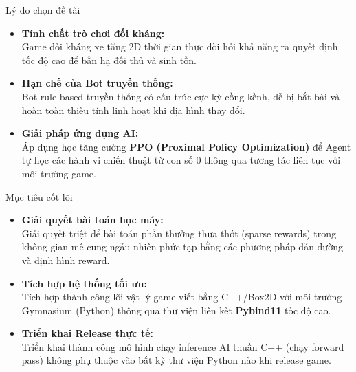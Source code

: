 \documentclass[aspectratio=169]{beamer}
\begin{document}
\begin{frame}{Lý do chọn đề tài}
  \begin{itemize}
    \item \textbf{\color{hustred}Tính chất trò chơi đối kháng:} \\
      Game đối kháng xe tăng 2D thời gian thực đòi hỏi khả năng ra quyết định tốc độ cao để bắn hạ đối thủ và sinh tồn.
    \vspace{0.8em}
    \item \textbf{\color{hustred}Hạn chế của Bot truyền thống:} \\
      Bot rule-based truyền thống có cấu trúc cực kỳ cồng kềnh, dễ bị bắt bài và hoàn toàn thiếu tính linh hoạt khi địa hình thay đổi.
    \vspace{0.8em}
    \item \textbf{\color{hustgreen}Giải pháp ứng dụng AI:} \\
      Áp dụng học tăng cường \textbf{PPO (Proximal Policy Optimization)} để Agent tự học các hành vi chiến thuật từ con số 0 thông qua tương tác liên tục với môi trường game.
  \end{itemize}
\end{frame}

\begin{frame}{Mục tiêu cốt lõi}
  \begin{itemize}
    \item \textbf{\color{hustred}Giải quyết bài toán học máy:} \\
      Giải quyết triệt để bài toán phần thưởng thưa thớt (sparse rewards) trong không gian mê cung ngẫu nhiên phức tạp bằng các phương pháp dẫn đường và định hình reward.
    \vspace{0.8em}
    \item \textbf{\color{hustred}Tích hợp hệ thống tối ưu:} \\
      Tích hợp thành công lõi vật lý game viết bằng C++/Box2D với môi trường Gymnasium (Python) thông qua thư viện liên kết \textbf{Pybind11} tốc độ cao.
    \vspace{0.8em}
    \item \textbf{\color{hustgreen}Triển khai Release thực tế:} \\
      Triển khai thành công mô hình chạy inference AI thuần C++ (chạy forward pass) không phụ thuộc vào bất kỳ thư viện Python nào khi release game.
  \end{itemize}
\end{frame}
\end{document}
